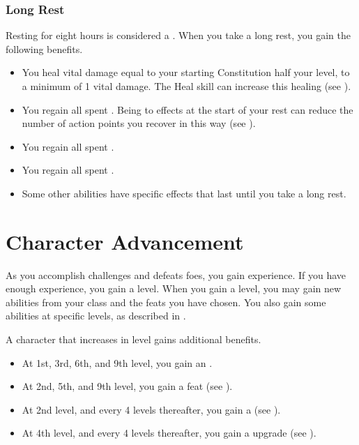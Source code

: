         \subsubsection{Long Rest}\label{Long Rest}
            Resting for eight hours is considered a .
            When you take a long rest, you gain the following benefits.
            \begin{itemize}
                \item You heal vital damage equal to your starting Constitution \add half your level, to a minimum of 1 vital damage.
                    The Heal skill can increase this healing (see ).
                \item You regain all spent .
                    Being  to effects at the start of your rest can reduce the number of action points you recover in this way (see ).
                \item You regain all spent .
                \item You regain all spent .
                \item Some other abilities have specific effects that last until you take a long rest.
            \end{itemize}

\section{Character Advancement}\label{Character Advancement}

    As you accomplish challenges and defeats foes, you gain experience.
    If you have enough experience, you gain a level.
    When you gain a level, you may gain new abilities from your class and the feats you have chosen.
    You also gain some abilities at specific levels, as described in .

    A character that increases in level gains additional benefits.
    \begin{itemize}
        \item At 1st, 3rd, 6th, and 9th level, you gain an .
        \item At 2nd, 5th, and 9th level, you gain a feat (see ).
        \item At 2nd level, and every 4 levels thereafter, you gain a  (see ).
        \item At 4th level, and every 4 levels thereafter, you gain a  upgrade (see ).
    \end{itemize}


